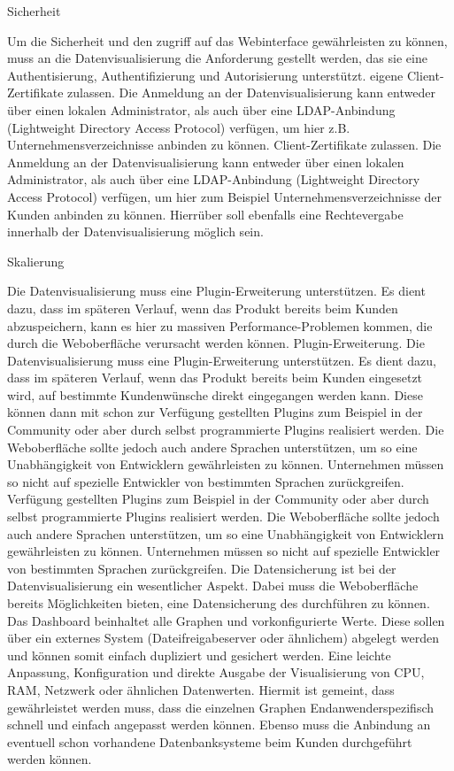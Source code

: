 {Sicherheit
\begin{outline}
  \1 Um die Sicherheit und den zugriff auf das Webinterface gewährleisten zu
  können, muss an die Datenvisualisierung die Anforderung gestellt werden, das
  sie eine Authentisierung, Authentifizierung und Autorisierung unterstützt.
  eigene Client-Zertifikate zulassen. Die Anmeldung an der Datenvisualisierung
  kann entweder über einen lokalen Administrator, als auch über eine
  LDAP\hyp{}Anbindung (Lightweight Directory Access Protocol) verfügen, um hier z.B.
  Unternehmensverzeichnisse anbinden zu können.
  Client-Zertifikate zulassen. Die Anmeldung an der Datenvisualisierung kann
  entweder über einen lokalen Administrator, als auch über eine LDAP-Anbindung
  (Lightweight Directory Access Protocol) verfügen, um hier zum Beispiel
  Unternehmensverzeichnisse der Kunden anbinden zu können. Hierrüber soll
  ebenfalls eine Rechtevergabe innerhalb der Datenvisualisierung möglich sein.
\end{outline}

Skalierung
\begin{outline}
  \1 Die Datenvisualisierung muss eine Plugin-Erweiterung unterstützen. Es
  dient dazu, dass im späteren Verlauf, wenn das Produkt bereits beim Kunden
  abzuspeichern, kann es hier zu massiven Performance-Problemen kommen, die
  durch die Weboberfläche verursacht werden können.
  \1 Plugin\hyp{}Erweiterung. Die Datenvisualisierung muss eine Plugin\hyp{}Erweiterung
  unterstützen. Es dient dazu, dass im späteren Verlauf, wenn das Produkt
  bereits beim Kunden eingesetzt wird, auf bestimmte Kundenwünsche direkt
  eingegangen werden kann. Diese können dann mit schon zur Verfügung gestellten
  Plugins zum Beispiel in der Community oder aber durch selbst programmierte
  Plugins realisiert werden. Die Weboberfläche sollte jedoch auch andere
  Sprachen unterstützen, um so eine Unabhängigkeit von Entwicklern
  gewährleisten zu können. Unternehmen müssen so nicht auf spezielle Entwickler
  von bestimmten Sprachen zurückgreifen.
  Verfügung gestellten Plugins zum Beispiel in der Community oder aber durch
  selbst programmierte Plugins realisiert werden. Die Weboberfläche sollte
  jedoch auch andere Sprachen unterstützen, um so eine Unabhängigkeit von
  Entwicklern gewährleisten zu können. Unternehmen müssen so nicht auf
  spezielle Entwickler von bestimmten Sprachen zurückgreifen.
  \1 Die Datensicherung ist bei der Datenvisualisierung ein wesentlicher
  Aspekt. Dabei muss die Weboberfläche bereits Möglichkeiten bieten, eine
  Datensicherung des  durchführen zu können. Das
  Dashboard beinhaltet alle Graphen und vorkonfigurierte Werte. Diese sollen
  über ein externes System (Dateifreigabeserver oder ähnlichem) abgelegt werden
  und können somit einfach dupliziert und gesichert werden.
  \1 Eine leichte Anpassung, Konfiguration und direkte Ausgabe der
  Visualisierung von CPU, RAM, Netzwerk oder ähnlichen Datenwerten. Hiermit ist
  gemeint, dass gewährleistet werden muss, dass die einzelnen Graphen
  Endanwenderspezifisch schnell und einfach angepasst werden können. Ebenso
  muss die Anbindung an eventuell schon vorhandene Datenbanksysteme beim Kunden
  durchgeführt werden können.
\end{outline}

}
